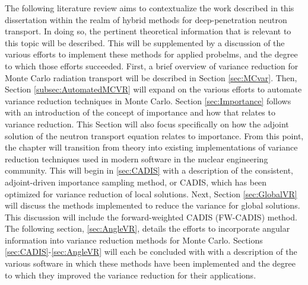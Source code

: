 The following literature review aims to contextualize the work described in this
dissertation within the realm of hybrid methods for deep-penetration
neutron transport. In doing
so, the pertinent theoretical information that is relevant to this
topic will be described.
This will be supplemented by a discussion of the various efforts to implement
these methods for applied probelms, and the degree to which those efforts
succeeded.
First, a brief overview of variance reduction for Monte Carlo radiation transport
will be described in Section \ref{sec:MCvar}.
Then, Section \ref{subsec:AutomatedMCVR} will expand on the
various efforts to automate variance reduction techniques in Monte Carlo.
Section \ref{sec:Importance} follows with an introduction of the concept of
importance and how that relates to variance reduction. This Section will also
focus specifically on how the adjoint solution of the neutron transport equation
relates to importance.
From this point, the chapter will transition
from theory into existing implementations
of variance reduction techniques used in modern software in the nuclear
engineering community. This will begin in \ref{sec:CADIS} with a description of
the consistent, adjoint-driven importance sampling method, or CADIS, which has
been optimized for variance reduction of local solutions. Next, Section
\ref{sec:GlobalVR} will discuss the methods implemented to reduce the variance
for global solutions. This discussion will include
the forward-weighted CADIS (FW-CADIS) method.
The following section, \ref{sec:AngleVR}, details the efforts to incorporate
angular information into variance reduction methods for Monte Carlo.
Sections \ref{sec:CADIS}-\ref{sec:AngleVR} will each be
concluded with with a description of the
various software in which these methods have been implemented and the degree to
which they improved the variance reduction for their applications.

